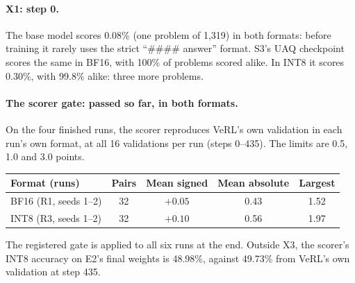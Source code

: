 \documentclass[11pt]{article}
\begin{document}
\paragraph{X1: step 0.} The base model scores 0.08\% (one problem of 1{,}319) in both formats: before training it rarely uses the strict ``\#\#\#\# answer'' format. S3's UAQ checkpoint scores the same in BF16, with 100\% of problems scored alike. In INT8 it scores 0.30\%, with 99.8\% alike: three more problems.

\paragraph{The scorer gate: passed so far, in both formats.} On the four finished runs, the scorer reproduces VeRL's own validation in each run's own format, at all 16 validations per run (steps 0--435). The limits are 0.5, 1.0 and 3.0 points.
\begin{center}\small
\begin{tabular}{@{}l c c c c@{}}
\toprule
Format (runs) & Pairs & Mean signed & Mean absolute & Largest\\
\midrule
BF16 (R1, seeds 1--2) & 32 & $+0.05$ & 0.43 & 1.52\\
INT8 (R3, seeds 1--2) & 32 & $+0.10$ & 0.56 & 1.97\\
\bottomrule
\end{tabular}
\end{center}
The registered gate is applied to all six runs at the end. Outside X3, the scorer's INT8 accuracy on E2's final weights is 48.98\%, against 49.73\% from VeRL's own validation at step 435.
\end{document}
